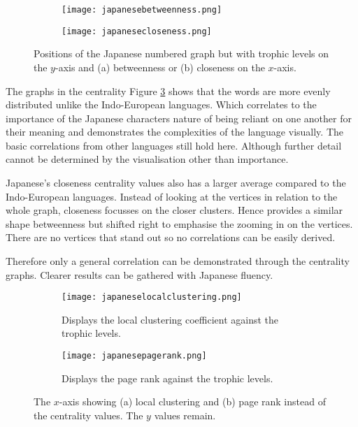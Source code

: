 \begin{figure}[!htb]
\centering
\begin{subfigure}{.45\textwidth}
	\hspace{-1cm} 
	\texttt{[image: japanesebetweenness.png]}
	\caption{}
	\label{fig:jpbc}
\end{subfigure}
\hfill
\begin{subfigure}{.45\textwidth}
	\hspace{-1cm} 
	\texttt{[image: japanesecloseness.png]}
	\caption{ }
	\label{fig:jpcc}
\end{subfigure}
\caption{Positions of the Japanese numbered graph but with trophic levels on the $y$-axis and (a) betweenness or (b) closeness on the $x$-axis.}
\label{fig:jpcentrality}
\end{figure}

The graphs in the centrality Figure \ref{fig:jpcentrality} shows that the words are more evenly distributed unlike the Indo-European languages. Which correlates to the importance of the Japanese characters nature of being reliant on one another for their meaning and demonstrates the complexities of the language visually. The basic correlations from other languages still hold here. Although further detail cannot be determined by the visualisation other than importance.

Japanese's closeness centrality values also has a larger average compared to the Indo-European languages. Instead of looking at the vertices in relation to the whole graph, closeness focusses on the closer clusters. Hence provides a similar shape betweenness but shifted right to emphasise the zooming in on the vertices. There are no vertices that stand out so no correlations can be easily derived.

Therefore only a general correlation can be demonstrated through the centrality graphs. Clearer results can be gathered with Japanese fluency.

\begin{figure}[!htb]
\centering
\begin{subfigure}{.45\textwidth}
	\hspace{-1cm} 
	\texttt{[image: japaneselocalclustering.png]}
	\caption{Displays the local clustering coefficient against the trophic levels.}
	\label{fig:jplc}
\end{subfigure}
\hfill
\begin{subfigure}{.45\textwidth}
	\hspace{-1cm} 
	\texttt{[image: japanesepagerank.png]}
	\caption{Displays the page rank against the trophic levels.}
	\label{fig:jppr}
\end{subfigure}
\caption{The $x$-axis showing (a) local clustering and (b) page rank instead of the centrality values. The $y$ values remain.}
\label{fig:jpother}
\end{figure}

